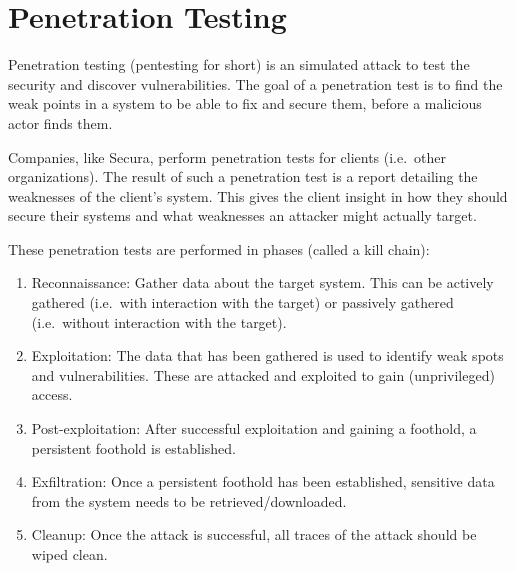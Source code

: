 \section{Penetration Testing}
Penetration testing (pentesting for short) is an simulated attack to test the security and discover vulnerabilities. The goal of a penetration test is to find the weak points in a system to be able to fix and secure them, before a malicious actor finds them.

Companies, like Secura, perform penetration tests for clients (i.e.\ other organizations). The result of such a penetration test is a report detailing the weaknesses of the client's system. This gives the client insight in how they should secure their systems and what weaknesses an attacker might actually target.

These penetration tests are performed in phases (called a kill chain):
\begin{enumerate}
    \item Reconnaissance: Gather data about the target system. This can be actively gathered (i.e.\ with interaction with the target) or passively gathered (i.e.\ without interaction with the target).
    \item Exploitation: The data that has been gathered is used to identify weak spots and vulnerabilities. These are attacked and exploited to gain (unprivileged) access.
    \item Post-exploitation: After successful exploitation and gaining a foothold, a persistent foothold is established.
    \item Exfiltration: Once a persistent foothold has been established, sensitive data from the system needs to be retrieved/downloaded.
    \item Cleanup: Once the attack is successful, all traces of the attack should be wiped clean.
\end{enumerate}

\medskip

